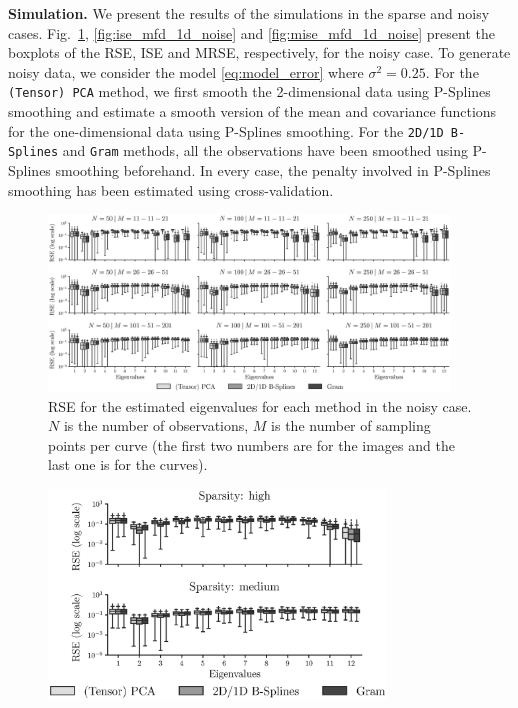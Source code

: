 \documentclass[times,sort&compress,3p]{elsarticle}
\theoremstyle{plain}%
\theoremstyle{definition}
\newenvironment{results}[1][]{\noindent \textbf{#1} \rmfamily}{\medskip}
\begin{document}
\begin{results}[Simulation.] We present the results of the simulations in the sparse and noisy cases. Fig.~\ref{fig:logAE_mfd_1d_noise}, \ref{fig:ise_mfd_1d_noise} and \ref{fig:mise_mfd_1d_noise} present the boxplots of the RSE, ISE and MRSE, respectively, for the noisy case. To generate noisy data, we consider the model \eqref{eq:model_error} where $\sigma^2 = 0.25$. For the \texttt{(Tensor) PCA} method, we first smooth the 2-dimensional data using P-Splines smoothing and estimate a smooth version of the mean and covariance functions for the one-dimensional data using P-Splines smoothing. For the \texttt{2D/1D B-Splines} and \texttt{Gram} methods, all the observations have been smoothed using P-Splines smoothing beforehand. In every case, the penalty involved in P-Splines smoothing has been estimated using cross-validation.
\begin{figure}
    \centering
    \includegraphics[width=0.95\textwidth]{AE_noise}
    \caption{RSE for the estimated eigenvalues for each method in the noisy case. $N$ is the number of observations, $M$ is the number of sampling points per curve (the first two numbers are for the images and the last one is for the curves).}
    \label{fig:logAE_mfd_1d_noise}
\end{figure}
\begin{figure}
    \centering
    \includegraphics[width=0.8\textwidth]{AE_sparse}

\end{figure}
\end{results}
\end{document}
